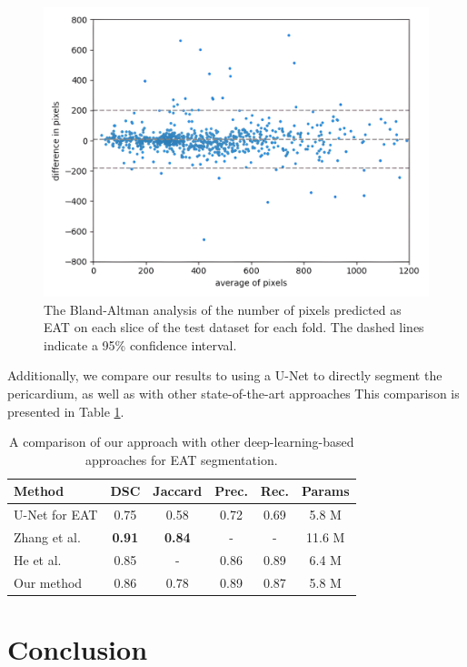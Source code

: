 \begin{figure}[h]
    \centering
    \includegraphics[width=0.65\columnwidth]{images/6/blaltman.jpg}
    \caption{The Bland-Altman analysis of the number of pixels predicted as EAT on each slice of the test dataset for each fold. The dashed lines indicate a 95\% confidence interval. \cite{bencevicEpicardialAdiposeTissue2021}}
    \label{fig:corr}
\end{figure}

Additionally, we compare our results to using a U-Net to directly segment the pericardium, as well as with other state-of-the-art approaches This comparison is presented in Table \ref{tab:comparison}.

\begin{table}[h]
\renewcommand{\arraystretch}{1.4}
\caption{A comparison of our approach with other deep-learning-based approaches for EAT segmentation.}
\centering
\begin{tabularx}{\textwidth}{Xccccc} 
 Method & DSC & Jaccard & Prec. & Rec. & Params \\
 \hline
 U-Net for EAT & 0.75 & 0.58 & 0.72 & 0.69 & 5.8 M \\ 
 Zhang et al. \cite{Zhang2020} & \textbf{0.91} & \textbf{0.84} & - & - & 11.6 M \\
 He et al. \cite{he2020} & 0.85 & - & 0.86 & 0.89 & 6.4 M \\
 Our method & 0.86 & 0.78 & 0.89 & 0.87 & 5.8 M \\
\end{tabularx}
\label{tab:comparison}
\end{table}

\clearpage

\section{Conclusion}\label{conclusion}

